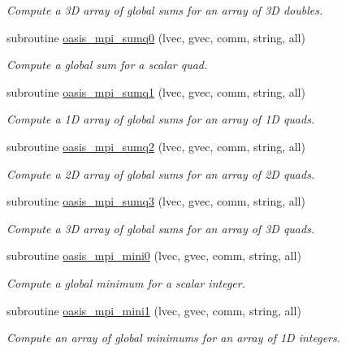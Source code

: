 \begin{DoxyCompactItemize}
\begin{DoxyCompactList}\small\item\em Compute a 3D array of global sums for an array of 3D doubles. \end{DoxyCompactList}\item 
subroutine \hyperlink{namespacemod__oasis__mpi_a2901cf7eaf807b4df7bd82aefadfeed9}{oasis\+\_\+mpi\+\_\+sumq0} (lvec, gvec, comm, string, all)
\begin{DoxyCompactList}\small\item\em Compute a global sum for a scalar quad. \end{DoxyCompactList}\item 
subroutine \hyperlink{namespacemod__oasis__mpi_a4a81062f1345805cdd828552272670c8}{oasis\+\_\+mpi\+\_\+sumq1} (lvec, gvec, comm, string, all)
\begin{DoxyCompactList}\small\item\em Compute a 1D array of global sums for an array of 1D quads. \end{DoxyCompactList}\item 
subroutine \hyperlink{namespacemod__oasis__mpi_aa9a5264e64523ff85ffb37ddc3b405ae}{oasis\+\_\+mpi\+\_\+sumq2} (lvec, gvec, comm, string, all)
\begin{DoxyCompactList}\small\item\em Compute a 2D array of global sums for an array of 2D quads. \end{DoxyCompactList}\item 
subroutine \hyperlink{namespacemod__oasis__mpi_a3f989a76dbe1896764d73ffea933130d}{oasis\+\_\+mpi\+\_\+sumq3} (lvec, gvec, comm, string, all)
\begin{DoxyCompactList}\small\item\em Compute a 3D array of global sums for an array of 3D quads. \end{DoxyCompactList}\item 
subroutine \hyperlink{namespacemod__oasis__mpi_a2832568cd4d34db40cdcc39ffa876474}{oasis\+\_\+mpi\+\_\+mini0} (lvec, gvec, comm, string, all)
\begin{DoxyCompactList}\small\item\em Compute a global minimum for a scalar integer. \end{DoxyCompactList}\item 
subroutine \hyperlink{namespacemod__oasis__mpi_aed0c20d56fdab764f0ad8e48e3a7209f}{oasis\+\_\+mpi\+\_\+mini1} (lvec, gvec, comm, string, all)
\begin{DoxyCompactList}\small\item\em Compute an array of global minimums for an array of 1D integers. \end{DoxyCompactList}\item 

\end{DoxyCompactItemize}
